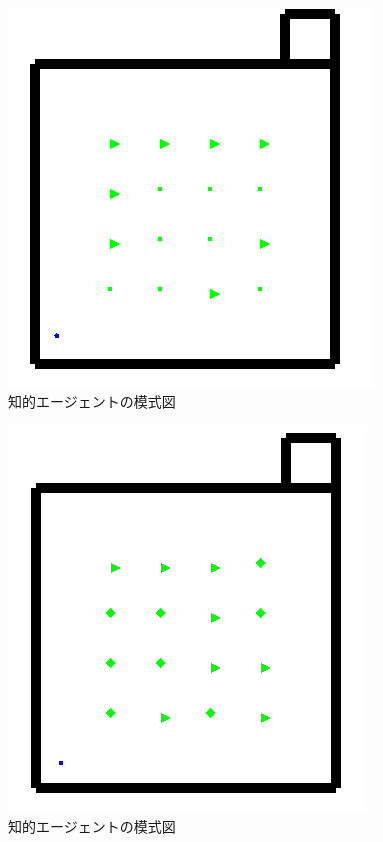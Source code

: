 \begin{figure}[htb]
\begin{center}
 \includegraphics[scale=0.6]{figures/health_frequently_urinate_v1.png}
 \caption[知的エージェントの模式図]{知的エージェントの模式図 \label{health_frequently_urinate_v1}}
\end{center}
\end{figure}

\begin{figure}[htb]
\begin{center}
 \includegraphics[scale=0.6]{figures/dementia_urinate_v1.png}
 \caption[知的エージェントの模式図]{知的エージェントの模式図 \label{dementia_urinate_v1}}
\end{center}
\end{figure}

